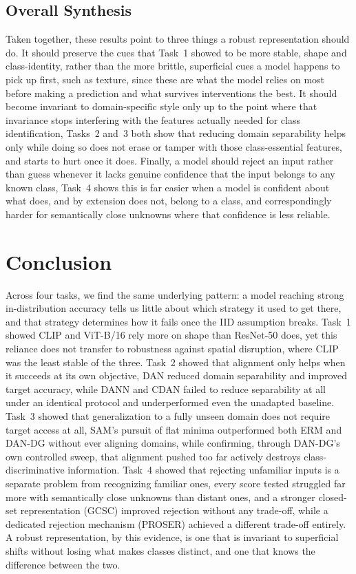 \documentclass{article}
\begin{document}
\subsection{Overall Synthesis}

Taken together, these results point to three things a robust representation should do. It should preserve the cues that Task~1 showed to be more stable, shape and class-identity, rather than the more brittle, superficial cues a model happens to pick up first, such as texture, since these are what the model relies on most before making a prediction and what survives interventions the best. It should become invariant to domain-specific style only up to the point where that invariance stops interfering with the features actually needed for class identification, Tasks~2 and~3 both show that reducing domain separability helps only while doing so does not erase or tamper with those class-essential features, and starts to hurt once it does. Finally, a model should reject an input rather than guess whenever it lacks genuine confidence that the input belongs to any known class, Task~4 shows this is far easier when a model is confident about what does, and by extension does not, belong to a class, and correspondingly harder for semantically close unknowns where that confidence is less reliable.

\section{Conclusion}

Across four tasks, we find the same underlying pattern: a model reaching strong in-distribution accuracy tells us little about which strategy it used to get there, and that strategy determines how it fails once the IID assumption breaks. Task~1 showed CLIP and ViT-B/16 rely more on shape than ResNet-50 does, yet this reliance does not transfer to robustness against spatial disruption, where CLIP was the least stable of the three. Task~2 showed that alignment only helps when it succeeds at its own objective, DAN reduced domain separability and improved target accuracy, while DANN and CDAN failed to reduce separability at all under an identical protocol and underperformed even the unadapted baseline. Task~3 showed that generalization to a fully unseen domain does not require target access at all, SAM's pursuit of flat minima outperformed both ERM and DAN-DG without ever aligning domains, while confirming, through DAN-DG's own controlled sweep, that alignment pushed too far actively destroys class-discriminative information. Task~4 showed that rejecting unfamiliar inputs is a separate problem from recognizing familiar ones, every score tested struggled far more with semantically close unknowns than distant ones, and a stronger closed-set representation (GCSC) improved rejection without any trade-off, while a dedicated rejection mechanism (PROSER) achieved a different trade-off entirely. A robust representation, by this evidence, is one that is invariant to superficial shifts without losing what makes classes distinct, and one that knows the difference between the two.


\renewcommand{\bibfont}{\footnotesize}


\end{document}

